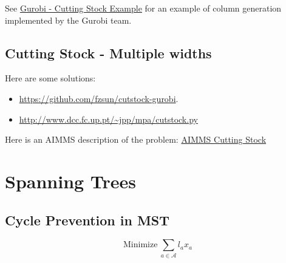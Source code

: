 See \href{https://github.com/Gurobi/modeling-examples/blob/master/colgen-cutting_stock/colgen-cutting_stock.ipynb}{Gurobi - Cutting Stock Example} for an example of column generation implemented by the Gurobi team.

\subsection{Cutting Stock - Multiple widths}

Here are some solutions:
\begin{itemize}
\item  \url{https://github.com/fzsun/cutstock-gurobi}.
\item \url{http://www.dcc.fc.up.pt/~jpp/mpa/cutstock.py}
\end{itemize}

Here is an AIMMS description of the problem: 
\href{https://download.aimms.com/aimms/download/manuals/AIMMS3OM_CuttingStock.pdf}{AIMMS Cutting Stock}


\section{Spanning Trees}
\label{sec:spanning-tree-models}
\subsection{Cycle Prevention in MST}
%
%
\[
\text{Minimize} \ \sum_{a \in \mathcal{A}} l_a x_a
\]
%
\begin{align*}
\end{align*}
%
